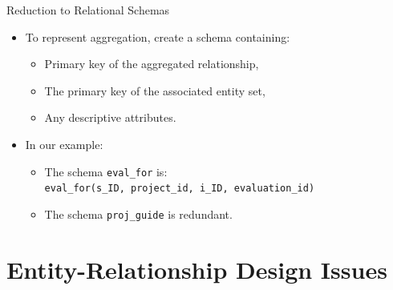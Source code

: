 \documentclass{beamer}
\begin{document}
\begin{frame}{Reduction to Relational Schemas}
    \begin{itemize}
        \item To represent aggregation, create a schema containing:
        \begin{itemize}
            \item Primary key of the aggregated relationship,
            \item The primary key of the associated entity set,
            \item Any descriptive attributes.
        \end{itemize}
        \item In our example:
        \begin{itemize}
            \item The schema \texttt{eval\_for} is: \\
                \texttt{eval\_for(s\_ID, project\_id, i\_ID, evaluation\_id)}
            \item The schema \texttt{proj\_guide} is redundant.
        \end{itemize}
    \end{itemize}
\end{frame}

\section{Entity-Relationship Design Issues}
\end{document}
